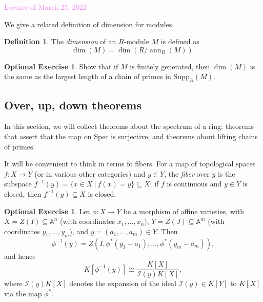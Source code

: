 \documentclass{amsart}[12pt]
\def\ann{\operatorname{ann}}
\def\Min{\operatorname{Min}}
\newcommand{\Mar}[1]{\textcolor{violet}{Lecture of March #1, 2022}}
\newcommand{\A}{\mathbb{A}}
\newcommand{\cI}{\mathcal{I}}
\newcommand{\p}{{\mathfrak p}}
\numberwithin{equation}{section}
\theoremstyle{plain} %
\theoremstyle{definition}
\newtheorem{definition}[equation]{Definition}
\newtheorem{exer}[equation]{Optional Exercise}
\theoremstyle{remark}
\newtheorem{remark}[equation]{Remark}
\newcommand{\Supp}{\mathrm{Supp}}
\begin{document}
%
%	
%
%


\Mar{25}

We give a related definition of dimension for modules.

\begin{definition} The \emph{dimension} of an $R$-module $M$ is defined as 
\[\dim(M)=\dim(R/\ann_R(M)).\]
\end{definition}

\begin{exer}
Show that if $M$ is finitely generated, then $\dim(M)$ is the same as the largest length of a chain of primes in $\Supp_R(M)$.
\end{exer}



\subsection{Over, up, down theorems}

In this section, we will collect theorems about the spectrum of a ring: theorems that assert that the map on Spec is surjective, and theorems about lifting chains of primes. 

It will be convenient to think in terms fo fibers. For a map of topological spaces $f: X\to Y$ (or in various other categories) and $y\in Y$, the \emph{fiber} over $y$ is the subspace $f^{-1}(y)= \{x\in X \ | \ f(x)=y\} \subseteq X$; if $f$ is continuous and $y\in Y$ is closed, then $f^{-1}(y) \subseteq X$ is closed. 


\begin{exer} Let $\phi:X\to Y$ be a morphism of affine varieties, with $X=Z(I) \subseteq \A^n$ (with coordinates $x_1,\dots,x_n$), $Y =Z(J) \subseteq \A^m$ (with coordinates $y_1,\dots,y_m$), and $y=(a_1,\dots,a_m)\in Y$. Then 
\[ \phi^{-1}(y) = Z(I, \phi^*(y_1-a_1),\dots,\phi^*(y_m-a_m)),\]
and hence 
\[K[\phi^{-1}(y)] \cong \frac{K[X]}{\cI(y) K[X]},\]
where $\cI(y) K[X]$ denotes the expansion of the ideal $\cI(y)\in K[Y]$ to $K[X]$ via the map $\phi^*$.
\end{exer}
\end{document}
